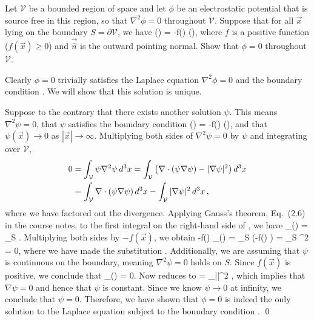\newcommand{\cV}{\mathcal{V}}
\newcommand{\lap}{\nabla^2}
\newcommand{\vx}{\vec{x}}
\newcommand{\dV}{\partial \cV}
\newcommand{\nh}{\vec{\hat{n}}}
\newcommand{\dcx}{\dd[3]{x}}
\newcommand{\vE}{\vec{E}}
\newcommand{\En}{E_n}
\newcommand{\dS}{\dd{S}}

\begin{statement}{}
	Let $\cV$ be a bounded region of space and let $\phi$ be an electrostatic potential that is source free in this region, so that $\lap\phi = 0$ throughout $\cV$.  Suppose that for all $\vx$ lying on the boundary $S = \dV$, we have
	\beqn \label{given}
		\phi(\vx) = -f(\vx) \nh \cdot \nabla \psi(\vx),
	\eeqn
	where $f$ is a positive function ($f(\vx) \geq 0$) and $\nh$ is the outward pointing normal.  Show that $\phi = 0$ throughout $\cV$.
\end{statement}

\begin{solution}
	Clearly $\phi = 0$ trivially satisfies the Laplace equation $\lap\phi = 0$ and the boundary condition .  We will show that this solution is unique.
	
	Suppose to the contrary that there exists another solution $\psi$.  This means $\lap\psi = 0$, that $\psi$ satisfies the boundary condition
	\beqn \label{psibound}
		\psi(\vx) = -f(\vx) \nh \cdot \nabla \psi(\vx),
	\eeqn
	and that $\psi(\vx) \to 0$ as $|\vx| \to \infty$.  Multiplying both sides of $\lap\psi = 0$ by $\psi$ and integrating over $\cV$,
	\begin{align}
		0 &= \int_\cV \psi \lap \psi \dcx
		= \int_\cV \left( \nabla \cdot (\psi \nabla \psi) - |\nabla \psi|^2 \right) \dcx \notag \\
		&= \int_\cV \nabla \cdot (\psi \nabla \psi) \dcx - \int_\cV |\nabla \psi|^2 \dcx, \label{thing}
	\end{align}
	where we have factored out the divergence.  Applying Gauss's theorem, Eq.~(2.6) in the course notes, to the first integral on the right-hand side of , we have
	\beq
		\int_\cV \nabla \cdot (\psi \nabla \psi) \dcx = \int_S \psi \nh \cdot \nabla\psi \dS.
	\eeq
	Multiplying both sides by $-f(\vx)$, we obtain
	\beq
		-f(\vx) \int_\cV \nabla \cdot (\psi \nabla \psi) \dcx = \int_S \psi (-f(\vx) \nh \cdot \nabla\psi) \dS
		= \int_S \psi^2 \dS = 0,
	\eeq
	where we have made the substitution .  Additionally, we are assuming that $\psi$ is continuous on the boundary, meaning $\lap\psi = 0$ holds on $S$.  Since $f(\vx)$ is positive, we conclude that
	\beq
		\int_\cV \nabla \cdot (\psi \nabla \psi) \dcx = 0.
	\eeq
	Now  reduces to
	 = \int_\cV |\nabla \psi|^2 \dcx,
	\eeq
	which implies that $\nabla\psi = 0$ and hence that $\psi$ is constant.  Since we know $\psi \to 0$ at infinity, we conclude that $\psi = 0$.  Therefore, we have shown that $\phi = 0$ is indeed the only solution to the Laplace equation subject to the boundary condition . \qed
\end{solution}